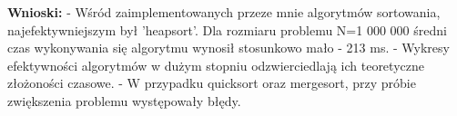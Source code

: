\documentclass[12pt,a4paper,titlepage]{article}
\begin{document}
\newline
\newline
\textbf{Wnioski: \newline}
\newline
- Wśród zaimplementowanych przeze mnie algorytmów sortowania, najefektywniejszym był 'heapsort'. Dla rozmiaru problemu N=1 000 000 średni czas wykonywania się algorytmu wynosił stosunkowo mało - 213 ms.\newline
\newline
- Wykresy efektywności algorytmów w dużym stopniu odzwierciedlają ich teoretyczne złożoności czasowe.\newline
\newline
- W przypadku quicksort oraz mergesort, przy próbie zwiększenia problemu występowały błędy.
\end{document}
